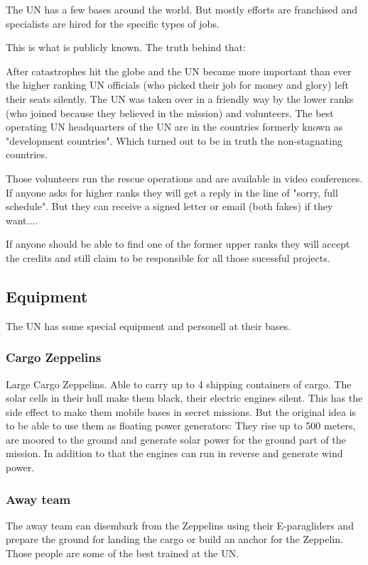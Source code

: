 The UN has a few bases around the world. But mostly efforts are franchised and specialists are hired for the specific types of jobs.

This is what is publicly known. The truth behind that:

After catastrophes hit the globe and the UN became more important than ever the higher ranking UN officials (who picked their job for money and glory) left their seats silently. The UN was taken over in a friendly way by the lower ranks (who joined because they believed in the mission) and volunteers. The best operating UN headquarters of the UN are in the countries formerly known as "development countries". Which turned out to be in truth the non-stagnating countries.

Those volunteers run the rescue operations and are available in video conferences. If anyone asks for higher ranks they will get a reply in the line of "sorry, full schedule". But they can receive a signed letter or email (both fakes) if they want....

If anyone should be able to find one of the former upper ranks they will accept the credits and still claim to be responsible for all those sucessful projects.

\subsection{Equipment}

The UN has some special equipment and personell at their bases.

\subsubsection{Cargo Zeppelins}
\label{sec: UN Cargo Zeppelins}
Large Cargo Zeppelins. Able to carry up to 4 shipping containers of cargo. The solar cells in their hull make them black, their electric engines silent. This has the side effect to make them mobile bases in secret missions. But the original idea is to be able to use them as floating power generators: They rise up to 500 meters, are moored to the ground and generate solar power for the ground part of the mission. In addition to that the engines can run in reverse and generate wind power.

\subsubsection{Away team}
\label{sec: UN away team}
The away team can disembark from the Zeppelins using their E-paragliders and prepare the ground for landing the cargo or build an anchor for the Zeppelin. Those people are some of the best trained at the UN.


